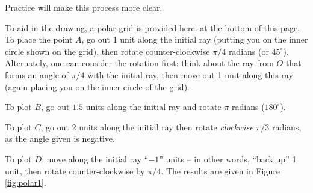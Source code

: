 Practice will make this process more clear.\\

{%
To aid in the drawing, a polar grid is provided
\iflatexml
here.
\else
at the bottom of this page.
\fi
To place the point $A$, go out 1 unit along the initial ray (putting you on the inner circle shown on the grid), then rotate counter-clockwise $\pi/4$ radians (or $45^\circ$).  Alternately, one can consider the rotation first: think about the ray from $O$ that forms an angle of $\pi/4$ with the initial ray, then move out 1 unit along this ray (again placing you on the inner circle of the grid).

To plot $B$, go out $1.5$ units along the initial ray and rotate $\pi$ radians ($180^\circ$). 

To plot $C$, go out 2 units along the initial ray then rotate \textit{clockwise} $\pi/3$ radians, as the angle given is negative.

To plot $D$, move along the initial ray ``$-1$'' units -- in other words, ``back up'' 1 unit, then rotate counter-clockwise by $\pi/4$. The results are given in Figure \ref{fig:polar1}.
}\\

